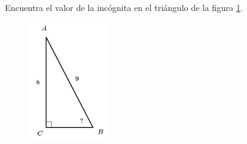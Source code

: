 \question[15]  Encuentra el valor de la incógnita en el triángulo de la figura \ref{fig:angle_functrig_07}.
\begin{figure}[H]
    \begin{center}
        \includegraphics[width=0.3\textwidth]{../images/angle_functrig_07.png}
    \end{center}
    \caption{}
    \label{fig:angle_functrig_07}
\end{figure}